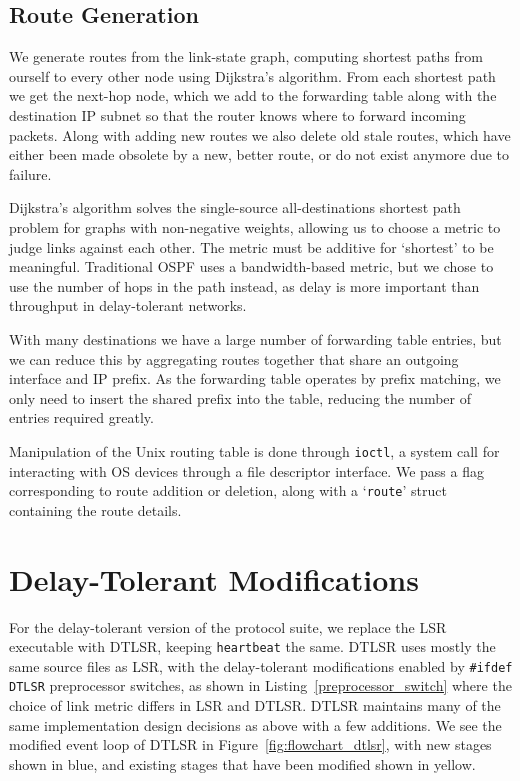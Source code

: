 \documentclass[withindex,glossary,openany]{cam-thesis}
\begin{document}
\subsection{Route Generation}

We generate routes from the link-state graph, computing shortest paths from ourself to every other node using Dijkstra's algorithm. From each shortest path we get the next-hop node, which we add to the forwarding table along with the destination IP subnet so that the router knows where to forward incoming packets. Along with adding new routes we also delete old stale routes, which have either been made obsolete by a new, better route, or do not exist anymore due to failure.

Dijkstra's algorithm solves the single-source all-destinations shortest path problem for graphs with non-negative weights, allowing us to choose a metric to judge links against each other. The metric must be additive for `shortest' to be meaningful. Traditional OSPF uses a bandwidth-based metric, but we chose to use the number of hops in the path instead, as delay is more important than throughput in delay-tolerant networks.

With many destinations we have a large number of forwarding table entries, but we can reduce this by aggregating routes together that share an outgoing interface and IP prefix. As the forwarding table operates by prefix matching, we only need to insert the shared prefix into the table, reducing the number of entries required greatly.

Manipulation of the Unix routing table is done through \texttt{ioctl}, a system call for interacting with OS devices through a file descriptor interface. We pass a flag corresponding to route addition or deletion, along with a `\texttt{route}' struct containing the route details.

\section{Delay-Tolerant Modifications}
\label{sec:dtlsr_design}

For the delay-tolerant version of the protocol suite, we replace the LSR executable with DTLSR, keeping \texttt{heartbeat} the same. DTLSR uses mostly the same source files as LSR, with the delay-tolerant modifications enabled by \texttt{\#ifdef DTLSR} preprocessor switches, as shown in Listing~\ref{preprocessor_switch} where the choice of link metric differs in LSR and DTLSR. DTLSR maintains many of the same implementation design decisions as above with a few additions. We see the modified event loop of DTLSR in Figure~\ref{fig:flowchart_dtlsr}, with new stages shown in blue, and existing stages that have been modified shown in yellow.
\end{document}
